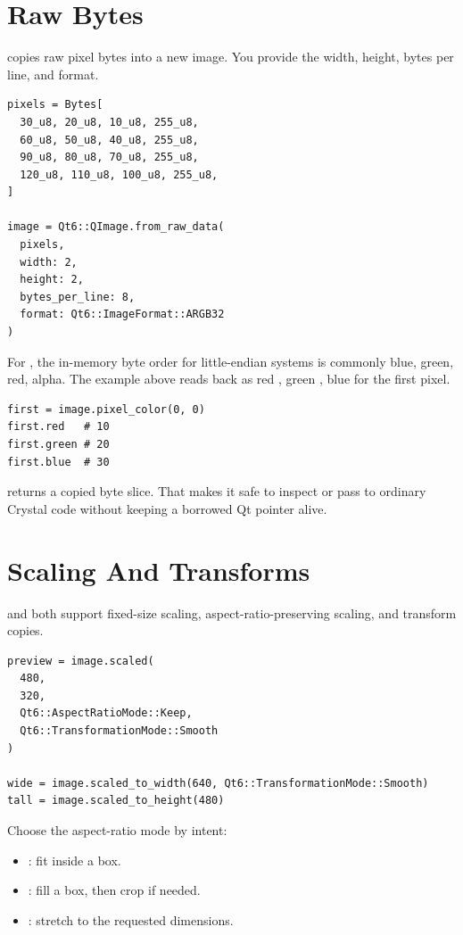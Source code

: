 \section{Raw Bytes}

 copies raw pixel bytes into a new image. You provide the width, height, bytes per line, and format.

\begin{lstlisting}[style=crystal]
pixels = Bytes[
  30_u8, 20_u8, 10_u8, 255_u8,
  60_u8, 50_u8, 40_u8, 255_u8,
  90_u8, 80_u8, 70_u8, 255_u8,
  120_u8, 110_u8, 100_u8, 255_u8,
]

image = Qt6::QImage.from_raw_data(
  pixels,
  width: 2,
  height: 2,
  bytes_per_line: 8,
  format: Qt6::ImageFormat::ARGB32
)
\end{lstlisting}

For , the in-memory byte order for little-endian systems is commonly blue, green, red, alpha. The example above reads back as red , green , blue  for the first pixel.

\begin{lstlisting}[style=crystal]
first = image.pixel_color(0, 0)
first.red   # 10
first.green # 20
first.blue  # 30
\end{lstlisting}

 returns a copied byte slice. That makes it safe to inspect or pass to ordinary Crystal code without keeping a borrowed Qt pointer alive.

\section{Scaling And Transforms}

 and  both support fixed-size scaling, aspect-ratio-preserving scaling, and transform copies.

\begin{lstlisting}[style=crystal]
preview = image.scaled(
  480,
  320,
  Qt6::AspectRatioMode::Keep,
  Qt6::TransformationMode::Smooth
)

wide = image.scaled_to_width(640, Qt6::TransformationMode::Smooth)
tall = image.scaled_to_height(480)
\end{lstlisting}

Choose the aspect-ratio mode by intent:

\begin{itemize}
\item {}: fit inside a box.
\item {}: fill a box, then crop if needed.
\item {}: stretch to the requested dimensions.
\end{itemize}

